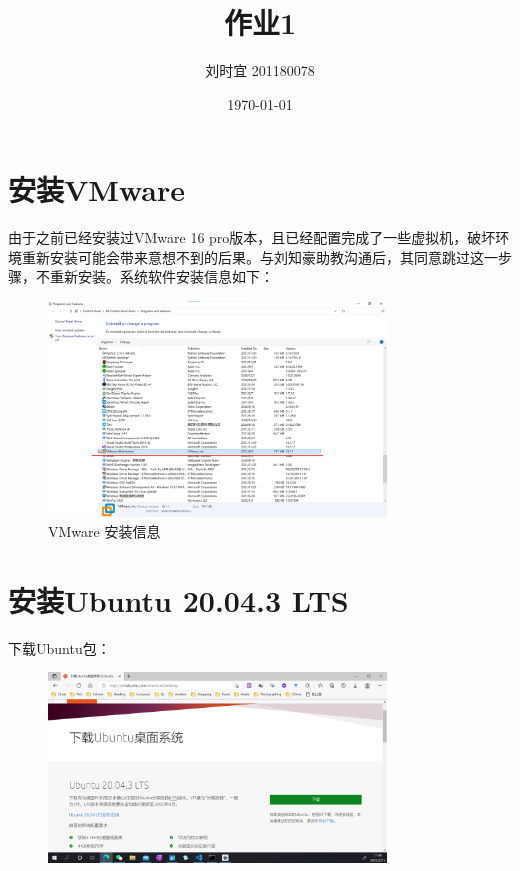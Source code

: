 \documentclass[UTF8]{ctexart}
\title{作业1}
\author{刘时宜 201180078}
\date{\today}
\begin{document}
    \maketitle
    \tableofcontents
    \section{安装VMware}
    由于之前已经安装过VMware 16 pro版本，且已经配置完成了一些虚拟机，破坏环境重新安装可能会带来意想不到的后果。与刘知豪助教沟通后，其同意跳过这一步骤，不重新安装。系统软件安装信息如下：
    \begin{figure}[H]
        \centering
        \includegraphics[width=0.8\textwidth]{assets/vmware_install.png}
        \caption{VMware 安装信息}
    \end{figure}

    \section{安装Ubuntu 20.04.3 LTS}
    下载Ubuntu包：
    \begin{figure}[H]
        \centering
        \includegraphics[width=0.8\textwidth]{assets/u1.png}
    \end{figure}
\end{document}
